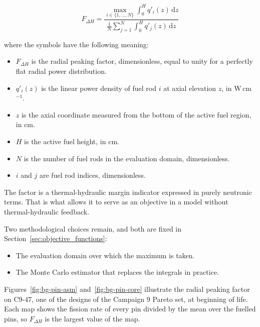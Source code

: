 \begin{equation}
F_{\Delta H}
=
\frac{\displaystyle \max_{i \in \{1,\dots,N\}} \int_{0}^{H} q'_i(z)\,\mathrm{d}z}
     {\displaystyle \frac{1}{N} \sum_{j=1}^{N} \int_{0}^{H} q'_j(z)\,\mathrm{d}z}
\label{eq:fdh_definition}
\end{equation}

\noindent where the symbols have the following meaning:

\begin{itemize}
  \item $F_{\Delta H}$ is the radial peaking factor, dimensionless,
        equal to unity for a perfectly flat radial power distribution.

  \item $q'_i(z)$ is the linear power density of fuel rod $i$ at axial
        elevation $z$, in W\,cm$^{-1}$.

  \item $z$ is the axial coordinate measured from the bottom of the
        active fuel region, in cm.

  \item $H$ is the active fuel height, in cm.

  \item $N$ is the number of fuel rods in the evaluation domain,
        dimensionless.

  \item $i$ and $j$ are fuel rod indices, dimensionless.
\end{itemize}

The factor is a thermal-hydraulic margin indicator expressed in purely
neutronic terms. That is what allows it to serve as an objective in a
model without thermal-hydraulic feedback.

Two methodological choices remain, and both are fixed in
Section~\ref{sec:objective_functions}:

\begin{itemize}
  \item The evaluation domain over which the maximum is taken.

  \item The Monte Carlo estimator that replaces the integrals in
        practice.
\end{itemize}

Figures~\ref{fig:bg-pin-asm} and~\ref{fig:bg-pin-core} illustrate the
radial peaking factor on C9-47, one of the designs of the Campaign 9
Pareto set, at beginning of life. Each map shows the fission rate of every pin divided by the mean
over the fuelled pins, so $F_{\Delta H}$ is the largest value of the
map.


